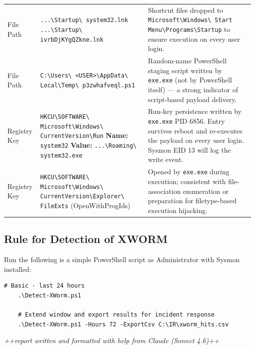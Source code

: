 \documentclass[10pt]{article}
\begin{document}
\begin{longtable}{p{2.8cm} p{6.8cm} p{5.0cm}}
File Path
  & \scriptsize{\texttt{...\textbackslash Startup\textbackslash
    system32.lnk} \newline
    \texttt{...\textbackslash Startup\textbackslash
    ivrbDjKYgQZkne.lnk}}
  & Shortcut files dropped to
    \texttt{Microsoft\textbackslash Windows\textbackslash
    Start Menu\textbackslash Programs\textbackslash Startup}
    to ensure execution on every user login. \\
\addlinespace
 
File Path
  & \scriptsize{\texttt{C:\textbackslash Users\textbackslash
    <USER>\textbackslash AppData\textbackslash
    Local\textbackslash Temp\textbackslash
    p3zwhafveql.ps1}}
  & Random-name PowerShell staging script written by
    \texttt{exe.exe} (not by PowerShell itself) — a
    strong indicator of script-based payload delivery. \\
\addlinespace
 
Registry Key
  & \texttt{\scriptsize HKCU\textbackslash SOFTWARE\textbackslash
    Microsoft\textbackslash Windows\textbackslash
    CurrentVersion\textbackslash Run} \newline
    \textbf{Name:} \texttt{system32} \newline
    \textbf{Value:}
    \texttt{...\textbackslash Roaming\textbackslash
    system32.exe}
  & Run-key persistence written by \texttt{exe.exe}
    PID 6856. Entry survives reboot and re-executes
    the payload on every user login.
    Sysmon EID 13 will log the write event. \\
\addlinespace
 
Registry Key
  & \texttt{\scriptsize HKCU\textbackslash SOFTWARE\textbackslash
    Microsoft\textbackslash Windows\textbackslash
    CurrentVersion\textbackslash Explorer\textbackslash
    FileExts} (OpenWithProgIds)
  & Opened by \texttt{exe.exe} during execution;
    consistent with file-association enumeration or
    preparation for filetype-based execution hijacking. \\
 
\end{longtable}
\subsection{Rule for Detection of XWORM}
Run the following is a simple PowerShell script as Administrator with Sysmon installed:
\begin{lstlisting}[style=terminal]
	# Basic - last 24 hours
	.\Detect-XWorm.ps1

	# Extend window and export results for incident response
	.\Detect-XWorm.ps1 -Hours 72 -ExportCsv C:\IR\xworm_hits.csv
\end{lstlisting}

\vfill
\textit{++report written and formatted with help from Claude (Sonnet 4.6)++}
\end{document}
